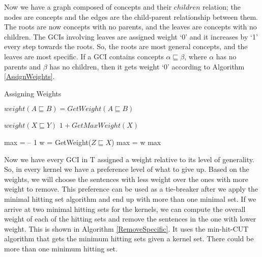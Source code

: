 \documentclass{sfuthesis}
\theoremstyle{plain}
\theoremstyle{definition}
\begin{document}
Now we have a graph composed of concepts and their $children$ relation; the nodes are concepts and the edges are the child-parent relationship between them. The roots are now concepts with no parents, and the leaves are concepts with no children. The GCIs involving leaves are assigned weight `0' and it increases by `1' every step towards the roots. So, the roots are most general concepts, and the leaves are most specific. If a GCI contains concepts $\alpha \sqsubseteq \beta$, where $\alpha$ has no parents and $\beta$ has no children, then it gets weight `0' according to Algorithm \ref{AssignWeights}.

\begin{algorithm}
\caption{Assigning Weights}
\label{AssignWeights}
\begin{algorithmic}[1]
\State $weight(A \sqsubseteq B) = GetWeight(A \sqsubseteq B)$
\EndFor
\EndFunction
\end{algorithmic}

\begin{algorithmic}[1]
\State
\Return $weight(X \sqsubseteq Y)$
\EndIf
{}
\State
{}
\Else
\State
\Return $1 + GetMaxWeight(X)$
\EndIf
\EndFunction
\end{algorithmic}

\begin{algorithmic}[1]
\State max = -- 1
\State w = GetWeight($Z \sqsubseteq X$)
\State max = w
\EndIf
\EndFor
\State
\Return max
\EndFunction
\end{algorithmic}
\end{algorithm}

Now we have every GCI in T assigned a weight relative to its level of generality. So, in every kernel we have a preference level of what to give up. Based on the weights, we will choose the sentences with less weight over the ones with more weight to remove. This preference can be used as a tie-breaker after we apply the minimal hitting set algorithm and end up with more than one minimal set. If we arrive at two minimal hitting sets for the kernels, we can compute the overall weight of each of the hitting sets and remove the sentences in the one with lower weight. This is shown in Algorithm \ref{RemoveSpecific}. It uses the min-hit-CUT algorithm that gets the minimum hitting sets given a kernel set. There could be more than one minimum hitting set.
\end{document}
